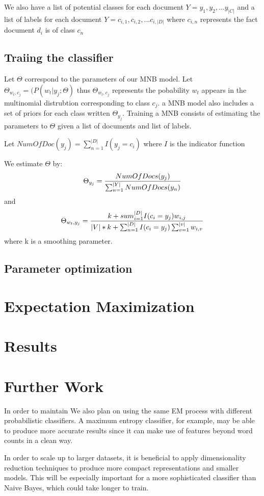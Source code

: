 \documentclass{article} %
\begin{document}
We also have a list of potential classes for each document $Y = {y_1,y_2,...y_{|C|}}$ and a list of labels for each document
$Y =  {c_{i,1},c_{i,2},...c_{i,|D|}}$ where $c_{i,n}$ represents the fact document $d_i$ is of class $c_n$

\subsection{Traiing the classifier}
Let $\Theta$ correspond to the parameters of our MNB model. Let $\Theta_{w_t,c_j} = (P(w_t|y_j;\Theta)$ thus $\Theta_{w_t,c_j}$
represents the pobability $w_t$ appears in the multinomial distrubtion corresponding to class $c_j$.  a MNB model also includes
a set of priors for each class written $\Theta_{y_j}$. 
Training a MNB consists of estimating the parameters to $\Theta$ given a list of documents and list of labels.

Let $NumOfDoc(y_j) = \sum_{n=1}^{|D|}I(y_j = c_i)$ where $I$ is the indicator function

We estimate $\Theta$ by:
 \[\Theta_{y_j}= {NumOfDocs(y_j)\over{\sum_{n=1}^{|Y|}NumOfDocs(y_n)}}\]
and 
\[\Theta_{w_t,y_j} = {k + sum_{i=1}^{|D|} I(c_i = y_j)w_{i,j}\over{|V| * k + \sum_{n=1}^{|D|}I(c_i = y_j)\sum_{v=1}^{|v|}w_{i,v}}}\]
where k is a smoothing parameter.
\subsection{Parameter optimization}


\section{Expectation Maximization}

\section{Results}

\section{Further Work}
In order to maintain 
We also plan on using the same EM process with different probabilistic classifiers. A maximum entropy classifier, for example, may be able to produce more accurate results since it can make use of features beyond word counts in a clean way. 

In order to scale up to larger datasets, it is beneficial to apply dimensionality reduction techniques to produce more compact representations and smaller models. This will be especially important for a more sophisticated classifier than Naive Bayes, which could take longer to train.
 
\end{document}
